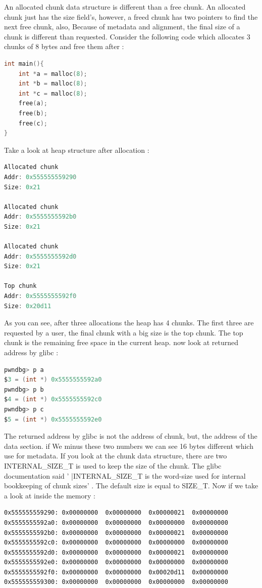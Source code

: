 \documentclass{masterthesis}
\newcommand*\sizet{SIZE\_T}
\newcommand*\libc{glibc}
\begin{document}
An allocated chunk data structure is different than a free chunk. An allocated chunk just has the size field's, however, a freed chunk has two pointers to find the next free chunk, also, Because of metadata and alignment, the final size of a chunk is different than requested. Consider the following code which allocates 3 chunks of 8 bytes and free them after :

\begin{lstlisting}[language=c,frame=tlrb]
int main(){
	int *a = malloc(8);
	int *b = malloc(8);
	int *c = malloc(8);
	free(a);
	free(b);
	free(c);
}
\end{lstlisting}

Take a look at heap structure after allocation : 

\begin{lstlisting}[language=c,frame=tlrb]
Allocated chunk
Addr: 0x555555559290
Size: 0x21

Allocated chunk
Addr: 0x5555555592b0
Size: 0x21

Allocated chunk
Addr: 0x5555555592d0
Size: 0x21

Top chunk 
Addr: 0x5555555592f0
Size: 0x20d11
\end{lstlisting}

As you can see, after three allocations the heap has 4 chunks. The first three are requested by a user, the final chunk with a big size is the top chunk. The top chunk is the remaining free space in the current heap. now look at returned address by \libc{} :

\begin{lstlisting}[language=c,frame=tlrb]
pwndbg> p a
$3 = (int *) 0x5555555592a0
pwndbg> p b
$4 = (int *) 0x5555555592c0
pwndbg> p c
$5 = (int *) 0x5555555592e0
\end{lstlisting}

The returned address by \libc{} is not the address of chunk, but, the address of the data section. if We minus these two numbers we can see 16 bytes different which use for metadata. If you look at the chunk data structure, there are two INTERNAL\_SIZE\_T is used to keep the size of the chunk. The \libc{} documentation said ' |INTERNAL\_SIZE\_T is the word-size used for internal bookkeeping of chunk sizes' . The default size is equal to \sizet{}. Now if we take a look at inside the memory : 

\begin{lstlisting}[frame=tlrb]
0x555555559290:	0x00000000	0x00000000	0x00000021	0x00000000
0x5555555592a0:	0x00000000	0x00000000	0x00000000	0x00000000
0x5555555592b0:	0x00000000	0x00000000	0x00000021	0x00000000
0x5555555592c0:	0x00000000	0x00000000	0x00000000	0x00000000
0x5555555592d0:	0x00000000	0x00000000	0x00000021	0x00000000
0x5555555592e0:	0x00000000	0x00000000	0x00000000	0x00000000
0x5555555592f0:	0x00000000	0x00000000	0x00020d11	0x00000000
0x555555559300:	0x00000000	0x00000000	0x00000000	0x00000000
\end{lstlisting}
\end{document}
